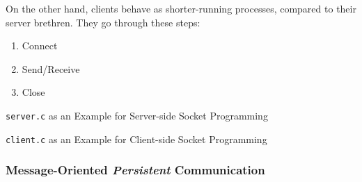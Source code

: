 On the other hand, clients behave as shorter-running processes, compared to their server brethren.
They go through these steps:
\begin{enumerate}[noitemsep]
\item Connect
\item Send/Receive
\item Close
\end{enumerate}

\begin{listing}[h!tbp]
\caption{\texttt{server.c} as an Example for Server-side Socket Programming}
\label{lst:Server_Side_Socket_Programming}
\end{listing}

\begin{listing}[h!tbp]
\caption{\texttt{client.c} as an Example for Client-side Socket Programming}
\label{lst:Client_Side_Socket_Programming}
\end{listing}

\subsubsection{Message-Oriented \emph{Persistent} Communication}\label{subsubsec:Persistent_Communication}

